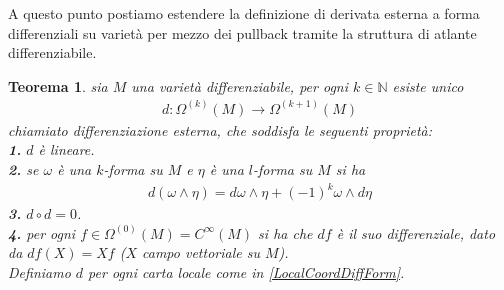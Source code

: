 \documentclass[twoside, 11pt]{amsbook}
\newcommand{\0}{{(0)}}
\newcommand{\3}{{(3)}}
\theoremstyle{colonplain}
\newtheorem{thm}{Teorema}[chapter]
\theoremstyle{colondefinition}
\theoremstyle{colonremark}
\numberwithin{equation}{chapter}
\begin{document}
A questo punto postiamo estendere la definizione di derivata esterna a forma differenziali su varietà per mezzo dei pullback tramite la struttura di atlante differenziabile.
\begin{thm} sia $M$ una varietà differenziabile, per ogni $k \in \mathbb{N}$ esiste unico
\begin{align}
    d : \Omega^{(k)}(M) \longrightarrow \Omega^{(k + 1)}(M)
\end{align}
chiamiato \textit{differenziazione esterna}, che soddisfa le seguenti proprietà: \\
\textbf{1.} $d$ è lineare. \\
\textbf{2.} se $\omega$ è una $k$-forma su $M$ e $\eta$ è una $l$-forma su $M$ si ha
\begin{align}
    d(\omega \wedge \eta) = d\omega \wedge \eta + (-1)^k\omega \wedge d\eta
\end{align}
\textbf{3.} $d \circ d = 0$. \\
\textbf{4.} per ogni $f \in \Omega^{(0)}(M) = C^\infty(M)$ si ha che $df$ è il suo differenziale, dato da $df(X) = Xf$ ($X$ campo vettoriale su $M$). \\
Definiamo $d$ per ogni carta locale come in \eqref{LocalCoordDiffForm}.
\end{thm}
\end{document}
